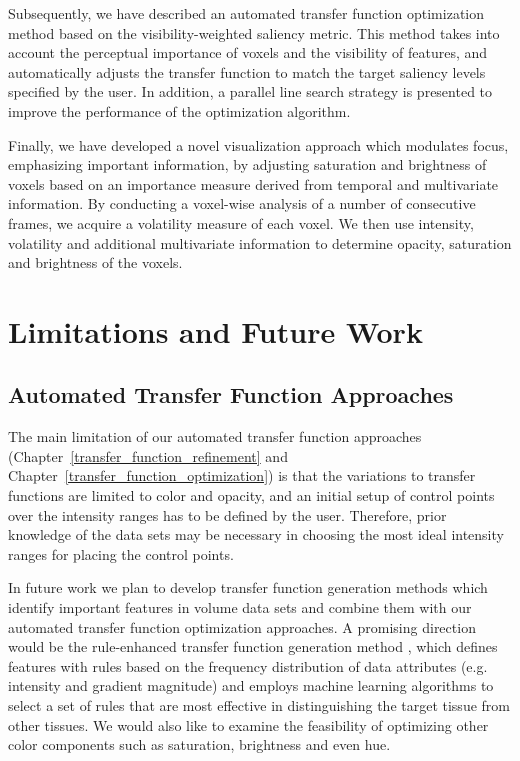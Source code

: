 Subsequently, we have described an automated transfer function optimization method based on the visibility-weighted saliency metric. This method takes into account the perceptual importance of voxels and the visibility of features, and automatically adjusts the transfer function to match the target saliency levels specified by the user. In addition, a parallel line search strategy is presented to improve the performance of the optimization algorithm.

Finally, we have developed a novel visualization approach which modulates focus, emphasizing important information, by adjusting saturation and brightness of voxels based on an importance measure derived from temporal and multivariate information.
By conducting a voxel-wise analysis of a number of consecutive frames, we acquire a volatility measure of each voxel. We then use intensity, volatility and additional multivariate information to determine opacity, saturation and brightness of the voxels.

\section{Limitations and Future Work}
\subsection{Automated Transfer Function Approaches}
The main limitation of our automated transfer function approaches (Chapter~\ref{transfer_function_refinement} and Chapter~\ref{transfer_function_optimization}) is that the variations to transfer functions are limited to color and opacity, and an initial setup of control points over the intensity ranges has to be defined by the user. Therefore, prior knowledge of the data sets may be necessary in choosing the most ideal intensity ranges for placing the control points.

In future work we plan to develop transfer function generation methods which identify important features in volume data sets and combine them with our automated transfer function optimization approaches. A promising direction would be the rule-enhanced transfer function generation method \cite{cai_rule-enhanced_2015}, which defines features with rules based on the frequency distribution of data attributes (e.g. intensity and gradient magnitude) and employs machine learning algorithms to select a set of rules that are most effective in distinguishing the target tissue from other tissues.
We would also like to examine the feasibility of optimizing other color components such as saturation, brightness and even hue. 

